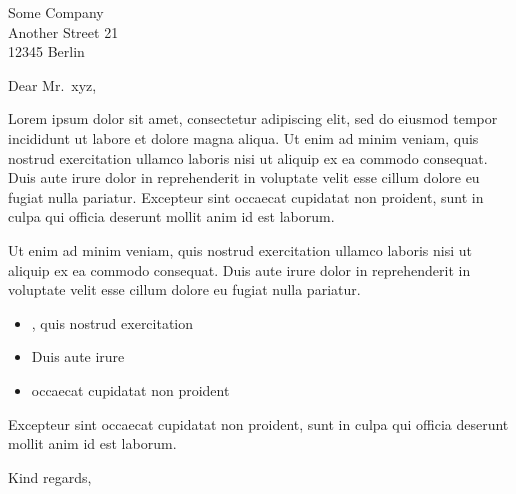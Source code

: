 \documentclass[version=last, fromalign=right, fontsize=11pt]{scrlttr2}
\begin{document}
\begin{letter}{Some Company\\Another Street 21\\12345 Berlin}
  \opening{Dear Mr.~xyz,}

  Lorem ipsum dolor sit amet, consectetur adipiscing elit, sed do
  eiusmod tempor incididunt ut labore et dolore magna aliqua. Ut enim ad
  minim veniam, quis nostrud exercitation ullamco laboris nisi ut
  aliquip ex ea commodo consequat. Duis aute irure dolor in
  reprehenderit in voluptate velit esse cillum dolore eu fugiat nulla
  pariatur. Excepteur sint occaecat cupidatat non proident, sunt in
  culpa qui officia deserunt mollit anim id est laborum.

  Ut enim ad minim veniam, quis nostrud exercitation ullamco laboris
  nisi ut aliquip ex ea commodo consequat. Duis aute irure dolor in
  reprehenderit in voluptate velit esse cillum dolore eu fugiat nulla
  pariatur.

  \begin{itemize}
  \item
    , quis
    nostrud exercitation
  \item
    Duis aute irure
  \item
     occaecat
    cupidatat non proident
  \end{itemize}

  Excepteur sint occaecat cupidatat non proident, sunt in culpa qui
  officia deserunt mollit anim id est laborum.

  \closing{Kind regards,}
  \vspace{-5cm}
\end{letter}
\end{document}
